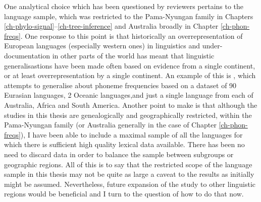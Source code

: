 One analytical choice which has been questioned by reviewers pertains to the language sample, which was restricted to the Pama-Nyungan family in Chapters \ref{ch-phylo-signal}--\ref{ch-tree-inference} and Australia broadly in Chapter \ref{ch-phon-freqs}. One response to this point is that historically an overrepresentation of European languages (especially western ones) in linguistics and under-documentation in other parts of the world has meant that linguistic generalisastions have been made often based on evidence from a single continent, or at least overrepresentation by a single continent. An example of this is \textcite{tambovtsev_phoneme_2007}, which attempts to generalise about phoneme frequencies based on a dataset of 90 Eurasian languages, 2 Oceanic languages,and just a single language from each of Australia, Africa and South America. Another point to make is that although the studies in this thesis are genealogically and geographically restricted, within the Pama-Nyungan family (or Australia generally in the case of Chapter \ref{ch-phon-freqs}), I have been able to include a maximal sample of all the languages for which there is sufficient high quality lexical data available. There has been no need to discard data in order to balance the sample between subgroups or geographic regions. All of this is to say that the restricted scope of the language sample in this thesis may not be quite as large a caveat to the results as initially might be assumed. Nevertheless, future expansion of the study to other linguistic regions would be beneficial and I turn to the question of how to do that now.

